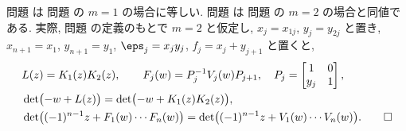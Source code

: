 \documentclass[12pt,twoside]{jarticle}
\begin{document}
\begin{rem}
  問題  は
  問題  の $m=1$ の場合に等しい.
  問題  は
  問題  の $m=2$ の場合と同値である.
  実際, 問題  の定義のもとで %
  $m=2$ と仮定し,  $x_j=x_{1j}$, $y_j=y_{2j}$ と置き, 
  $x_{n+1}=x_1$, $y_{n+1}=y_1$, 
  $\eps_j = x_jy_j$, $f_j = x_j+y_{j+1}$ と置くと, 
  \begin{align*}
    &
    L(z) = K_1(z)K_2(z),
    \qquad
    F_j(w) = P_j^{-1} V_j(w) P_{j+1},
    \quad
    P_j = 
    \begin{bmatrix}
      1   & 0 \\
      y_j & 1 \\
    \end{bmatrix},
    \\ &
    \det\bigl( -w + L(z) \bigr)
    =
    \det\bigl( -w + K_1(z)K_2(z) \bigr),
    \\ &
    \det\bigl( (-1)^{n-1}z + F_1(w)\cdots F_n(w) \bigr)
    =
    \det\bigl( (-1)^{n-1}z + V_1(w)\cdots V_n(w) \bigr).
    \qed
  \end{align*}
\end{rem}


%
%





\end{document}
